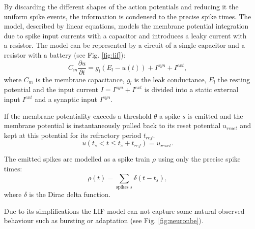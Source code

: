 By discarding the different shapes of the action potentials and reducing it the uniform spike events, the information is condensed to the precise spike times.
The model, described by linear equations, models the membrane potential integration due to spike input currents with a capacitor and introduces a leaky current with a resistor. 
The model can be represented by a circuit of a single capacitor and a resistor with a battery (see Fig. \ref{fig:lif}):
\[
C_m \frac{\partial u}{\partial t} = g_l ( E_l - u(t) ) + I^{syn} + I^{ext} , 
\]
where $C_m$ is the membrane capacitance, $g_l$ is the leak conductance, $E_l$ the resting potential and the input current $I = I^{syn} + I^{ext}$ is divided into a static external input $I^{ext}$ and a synaptic input $I^{syn}$.   

If the membrane potentiality exceeds a threshold $\theta$ a spike $s$ is emitted and the membrane potential is instantaneously pulled back to its reset potential $u_{reset}$ and kept at this potential for its refractory period $t_{ref}$.
\[
u(t_{s} < t \le t_{s} + t_{ref}) = u_{reset}.
\]

The emitted spikes are modelled as a spike train $\rho$ using only the precise spike times:
\[
\rho(t) = \sum_{\text{spikes } s} \delta(t-t_s),
\] 
where $\delta$ is the Dirac delta function.

Due to its simplifications the LIF model can not capture some natural observed behaviour such as bursting or adaptation (see Fig. \ref{fig:neuronbe}). 

